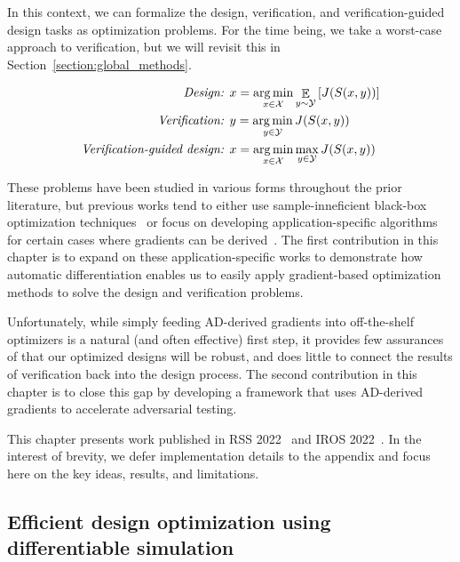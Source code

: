 In this context, we can formalize the design, verification, and verification-guided design tasks as optimization problems. For the time being, we take a worst-case approach to verification, but we will revisit this in Section~\ref{section:global_methods}.

\begin{align}
    \textit{Design: }                     & x = \operatorname*{arg\,min}_{x \in \mathcal{X}} \mathop{\mathbb{E}}_{y \sim \mathcal{Y}}\left[ J(S(x, y)) \right] \label{ch5:eq:design}     \\
    \textit{Verification: }               & y = \operatorname*{arg\,min}_{y \in \mathcal{Y}} J(S(x, y))    \label{ch5:eq:verification}                                    \\
    \textit{Verification-guided design: } & x = \operatorname*{arg\,min}_{x \in \mathcal{X}} \max_{y \in \mathcal{Y}} J(S(x, y)) \label{ch5:eq:verification_guided_design_minmax}
\end{align}

These problems have been studied in various forms throughout the prior literature, but previous works tend to either use sample-inneficient black-box optimization techniques~\cite{corsoAdaptiveStressTesting2019,corsoSurveyAlgorithmsBlackBox2021a,dingLearningCollideAdaptive2020a,wangAdvSimGeneratingSafetyCritical2021a} or focus on developing application-specific algorithms for certain cases where gradients can be derived~\cite{Schulz_robogami,du2016computational,du2021underwater,ma2021diffaqua,xu_uav_controllers}. The first contribution in this chapter is to expand on these application-specific works to demonstrate how automatic differentiation enables us to easily apply gradient-based optimization methods to solve the design and verification problems.

Unfortunately, while simply feeding AD-derived gradients into off-the-shelf optimizers is a natural (and often effective) first step, it provides few assurances of that our optimized designs will be robust, and does little to connect the results of verification back into the design process. The second contribution in this chapter is to close this gap by developing a framework that uses AD-derived gradients to accelerate adversarial testing.

This chapter presents work published in RSS 2022~\cite{dawsonCertifiableRobotDesign2022a} and IROS 2022~\cite{dawsonRobustCounterexampleguidedOptimization2022}. In the interest of brevity, we defer implementation details to the appendix and focus here on the key ideas, results, and limitations.

\subsection{Efficient design optimization using differentiable simulation}

